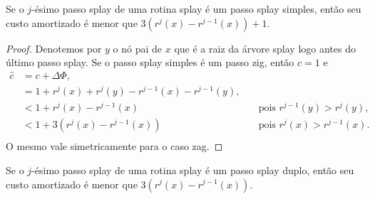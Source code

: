 \begin{lemma}
    Se o $j$-ésimo passo splay de uma rotina splay é um passo splay simples, então seu custo amortizado é menor que $3(r^{j}(x) - r^{j-1}(x)) + 1$.
\end{lemma}

\begin{proof}
    Denotemos por $y$ o nó pai de $x$ que é a raiz da árvore splay logo antes do último passo splay. Se o passo splay simples é um passo zig, então $c = 1$ e
    \begin{align*}
        \hat{c} &= c + \Delta \Phi,\\
        &= 1 + r^{j}(x) + r^{j}(y) - r^{j-1}(x) - r^{j-1}(y), \quad & \text{}\\
        &< 1 + r^{j}(x) - r^{j-1}(x) \quad & \text{pois $r^{j-1}(y) > r^{j}(y)$},\\
        &< 1 + 3(r^{j}(x) - r^{j-1}(x)) \quad & \text{pois $r^{j}(x) > r^{j-1}(x)$}.\\
    \end{align*}
    O mesmo vale simetricamente para o caso zag.
\end{proof}

\newpage

\begin{lemma}
    Se o $j$-ésimo passo splay de uma rotina splay é um passo splay duplo, então seu custo amortizado é menor que $3(r^{j}(x) - r^{j-1}(x))$.
\end{lemma}

